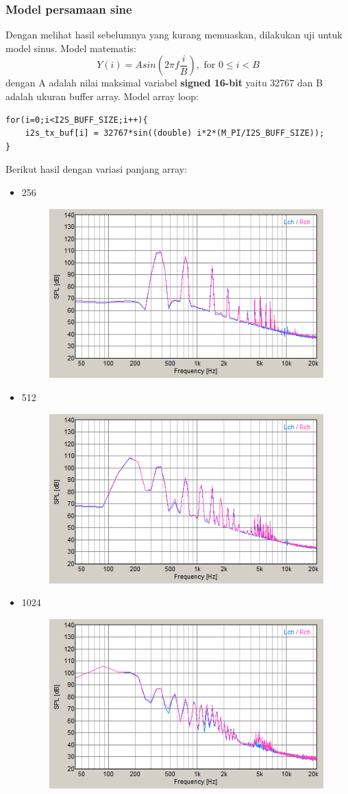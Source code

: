 \documentclass[12pt,]{article}
\begin{document}
 	 \newpage
 	 \subsubsection{Model persamaan sine}
 	 Dengan melihat hasil sebelumnya yang kurang memuaskan, dilakukan uji untuk model sinus.
 	 Model matematis:
 	 \[ Y(i) = A sin(2\pi f \frac{i}{B}), \text{ for } 0 \leq i < B \] 
 	 dengan A adalah nilai maksimal variabel \textbf{signed 16-bit} yaitu 32767
 	 dan B adalah ukuran buffer array.
 	 Model array loop:
 	 \begin{verbatim}
for(i=0;i<I2S_BUFF_SIZE;i++){
	i2s_tx_buf[i] = 32767*sin((double) i*2*(M_PI/I2S_BUFF_SIZE));
}
 	 \end{verbatim}
 	 Berikut hasil dengan variasi panjang array:
 	 \begin{itemize}
 	 	\item 256
 	 	\begin{figure}[H]
 	 		\centering
 	 		\includegraphics[width=0.45\linewidth]{result/day_1/max256}
 	 	\end{figure}
  	
  		\item 512
  		\begin{figure}[H]
  			\centering
  			\includegraphics[width=0.45\linewidth]{result/day_1/max512}
  		\end{figure}
  	
  		\item 1024
  		\begin{figure}[H]
  			\centering
  			\includegraphics[width=0.45\linewidth]{result/day_1/max1024}
  		\end{figure}
 	 \end{itemize} 
  
\end{document}
